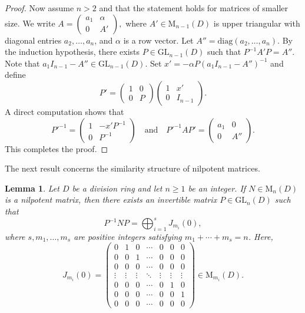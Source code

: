 \documentclass[11pt]{article}
\newtheorem{lemma}[theorem]{Lemma}
\theoremstyle{definition}
\begin{document}
{{{{\begin{proof}
					Now assume \( n > 2 \) and that the statement holds for matrices of smaller size. We write
					$
					A =
					\begin{pmatrix}
						a_1 & \alpha \\
						0 & A'
					\end{pmatrix},
					$
					where \( A' \in \mathrm{M}_{n-1}(D) \) is upper triangular with diagonal entries \( a_2, \ldots, a_n \), and \( \alpha \) is a row vector.	Let \( A'' = \mathrm{diag}(a_2, \ldots, a_n) \). By the induction hypothesis, there exists \( P \in \mathrm{GL}_{n-1}(D) \) such that \( P^{-1} A' P = A'' \). Note that \( a_1 I_{n-1} - A'' \in \mathrm{GL}_{n-1}(D) \). 	Set \( x' = -\alpha P (a_1 I_{n-1} - A'')^{-1} \) and define
					\[
					P' =
					\begin{pmatrix}
						1 & 0 \\
						0 & P
					\end{pmatrix}
					\begin{pmatrix}
						1 & x' \\
						0 & I_{n-1}
					\end{pmatrix}.
					\]
					A direct computation shows that
					\[
					P'^{-1} =
					\begin{pmatrix}
						1 & -x' P^{-1} \\
						0 & P^{-1}
					\end{pmatrix}
					\quad \text{and} \quad
					P'^{-1} A P' =
					\begin{pmatrix}
						a_1 & 0 \\
						0 & A''
					\end{pmatrix}.
					\]
					This completes the proof.
				\end{proof}
				
				The next result concerns the similarity structure of nilpotent matrices.
				
				\begin{lemma} {\rm\cite[Lemma 3.2]{Pa_AbLe_21}}\label{luy linh}
					Let \( D \) be a division ring and let \( n\geq1 \) be an integer. If \( N \in \mathrm{M}_n(D) \) is a nilpotent matrix, then there exists an invertible matrix \( P \in \mathrm{GL}_n(D) \) such that
					\[
					P^{-1} N P = \bigoplus_{i=1}^s J_{m_i}(0),
					\]
					where \( s, m_1, \ldots, m_s \) are positive integers satisfying \( m_1 + \cdots + m_s = n \). Here,
					\[
					J_{m_i}(0) = \begin{pmatrix}
						0 & 1 & 0 & \cdots & 0 & 0 & 0 \\
						0 & 0 & 1 & \cdots & 0 & 0 & 0 \\
						0 & 0 & 0 & \cdots & 0 & 0 & 0 \\
						\vdots & \vdots & \vdots & \ddots & \vdots & \vdots & \vdots \\
						0 & 0 & 0 & \cdots & 0 & 1 & 0 \\
						0 & 0 & 0 & \cdots & 0 & 0 & 1 \\
						0 & 0 & 0 & \cdots & 0 & 0 & 0
					\end{pmatrix} \in \mathrm{M}_{m_i}(D).
					\]
				\end{lemma}
				
}}}}
\end{document}
